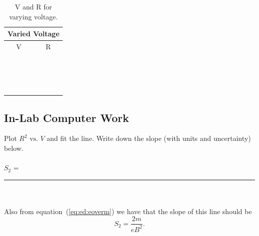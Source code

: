 \begin{table}[htb]
\begin{center}
\begin{tabular}{|c|c|}
\hline
\multicolumn{2}{|c|}{Varied Voltage}\\
\hline
V & R \\
\hline
\hspace*{5cm} & \hspace*{5cm} \\
& \\
\hline       
& \\
& \\
\hline
& \\
& \\
\hline
& \\
& \\
\hline
& \\
& \\
\hline
& \\
& \\
\hline
& \\
& \\
\hline
& \\
& \\
\hline
\end{tabular}
\end{center}
\caption{V and R for varying voltage.}
\label{tab:ed:pot}
\end{table}

\subsection{In-Lab Computer Work}
Plot $R^2 \mbox{ vs. } V$ and fit the line.  
Write down the slope (with units and uncertainty) below. \\
\ \\
\hspace*{5cm} $S_2$ =~\rule{3cm}{.1mm}\\ 
\ \\
\noindent Also from equation~(\ref{eq:ed:eoverm}) we have that
the slope of this line should be
$$S_2=\frac{2m}{eB^2}.$$
 
